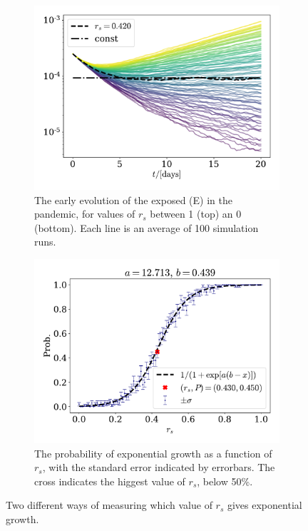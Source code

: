 \documentclass{article}
\begin{document}
    \begin{figure}[H]
        \centering
        \begin{subfigure}{.49\textwidth}
            \includegraphics[width=\textwidth]{../plots/2C/isolation.pdf}
            \caption{The early evolution of the exposed (E) in the pandemic, for values of $r_s$ between 1 (top) an 0 (bottom).
             Each line is an average of 100 simulation runs.}
            \label{isolation1}
        \end{subfigure}
        \begin{subfigure}{.49\textwidth}
            \includegraphics[width=\textwidth]{../plots/2C/isolation2_prob.pdf}
            \caption{The probability of exponential growth as a function of $r_s$, with the standard error indicated by errorbars.
            The cross indicates the higgest value of $r_s$, below 50\%.}
            \label{isolation2}
        \end{subfigure}
        \caption{Two different ways of measuring which value of $r_s$ gives exponential growth.}
        \label{isolation}
    \end{figure}
\end{document}
